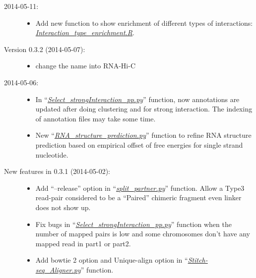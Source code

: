 \documentclass[letterpaper,10pt,english]{sphinxmanual}
\begin{document}
\begin{description}
\item[{2014-05-11:}] \leavevmode\begin{itemize}
\item {} 
Add new function to show enrichment of different types of interactions: {\hyperref[Visualization:visualizationenrich]{\emph{Interaction\_type\_enrichment.R}}}.

\end{itemize}

\item[{Version 0.3.2 (2014-05-07):}] \leavevmode\begin{itemize}
\item {} 
change the name into RNA-Hi-C

\end{itemize}

\item[{2014-05-06:}] \leavevmode\begin{itemize}
\item {} 
In ``{\hyperref[Analysis_pipeline:step6]{\emph{Select\_strongInteraction\_pp.py}}}'' function, now annotations are updated after doing clustering and for strong interaction. The indexing of annotation files may take some time.

\item {} 
New ``{\hyperref[Analysis_pipeline:structure]{\emph{RNA\_structure\_prediction.py}}}'' function to refine RNA structure prediction based on empirical offset of free energies for single strand nucleotide.

\end{itemize}

\item[{New features in 0.3.1 (2014-05-02):}] \leavevmode\begin{itemize}
\item {} 
Add ``--release'' option in ``{\hyperref[Analysis_pipeline:step4]{\emph{split\_partner.py}}}'' function. Allow a Type3 read-pair considered to be a ``Paired'' chimeric fragment even linker does not show up.

\item {} 
Fix bugs in ``{\hyperref[Analysis_pipeline:step6]{\emph{Select\_strongInteraction\_pp.py}}}'' function when the number of mapped pairs is low and some chromosomes don't have any mapped read in part1 or part2.

\item {} 
Add bowtie 2 option and Unique-align option in ``{\hyperref[Analysis_pipeline:step5]{\emph{Stitch-seq\_Aligner.py}}}'' function.


\end{itemize}
\end{description}
\end{document}
